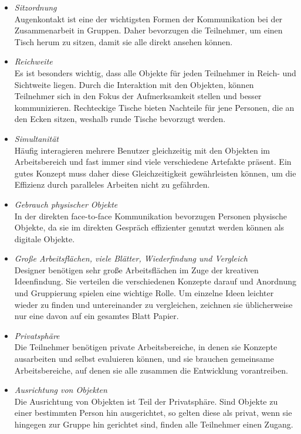 \begin{itemize} 
	\item{\emph{Sitzordnung}}\\
	Augenkontakt ist eine der wichtigsten Formen der Kommunikation bei der Zusammenarbeit in Gruppen. Daher bevorzugen die Teilnehmer, um einen Tisch herum zu sitzen, damit sie alle direkt ansehen können.
	\item{\emph{Reichweite}}\\
	Es ist besonders wichtig, dass alle Objekte für jeden Teilnehmer in Reich- und Sichtweite liegen. Durch die Interaktion mit den Objekten, können Teilnehmer sich in den Fokus der Aufmerksamkeit stellen und besser kommunizieren. Rechteckige Tische bieten Nachteile für jene Personen, die an den Ecken sitzen, weshalb runde Tische bevorzugt werden.
	\item{\emph{Simultanität}}\\
	Häufig interagieren mehrere Benutzer gleichzeitig mit den Objekten im Arbeitsbereich und fast immer sind viele verschiedene Artefakte präsent. Ein gutes Konzept muss daher diese Gleichzeitigkeit gewährleisten können, um die Effizienz durch paralleles Arbeiten nicht zu gefährden.
	\item{\emph{Gebrauch physischer Objekte}}\\
	In der direkten face-to-face Kommunikation bevorzugen Personen physische Objekte, da sie im direkten Gespräch effizienter genutzt werden können als digitale Objekte.
	\item{\emph{Große Arbeitsflächen, viele Blätter, Wiederfindung und Vergleich}}\\
	Designer benötigen sehr große Arbeitsflächen im Zuge der kreativen Ideenfindung. Sie verteilen die verschiedenen Konzepte darauf und Anordnung und Gruppierung spielen eine wichtige Rolle. Um einzelne Ideen leichter wieder zu finden und untereinander zu vergleichen, zeichnen sie üblicherweise nur eine davon auf ein gesamtes Blatt Papier.
	\item{\emph{Privatsphäre}}\\
	Die Teilnehmer benötigen private Arbeitsbereiche, in denen sie Konzepte ausarbeiten und selbst evaluieren können, und sie brauchen gemeinsame Arbeitsbereiche, auf denen sie alle zusammen die Entwicklung vorantreiben.
	\item{\emph{Ausrichtung von Objekten}}\\
	Die Ausrichtung von Objekten ist Teil der Privatsphäre. Sind Objekte zu einer bestimmten Person hin ausgerichtet, so gelten diese als privat, wenn sie hingegen zur Gruppe hin gerichtet sind, finden alle Teilnehmer einen Zugang.
\end{itemize}

